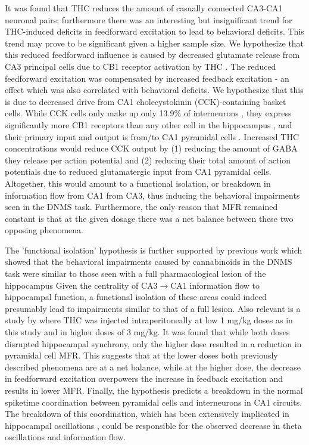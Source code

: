 \documentclass[11pt,a4paper,final]{article}
\begin{document}
It was found that THC reduces the amount of casually connected CA3-CA1 neuronal pairs; furthermore there was an interesting but insignificant trend for THC-induced deficits in feedforward excitation to lead to behavioral deficits.
This trend may prove to be significant given a higher sample size. 
We hypothesize that this reduced feedforward influence is caused by decreased glutamate release from CA3 principal cells due to CB1 receptor activation by THC \citep{shen96}.
The reduced feedforward excitation was compensated by increased feedback excitation - an effect which was also correlated with behavioral deficits.
We hypothesize that this is due to decreased drive from CA1 cholecystokinin (CCK)-containing basket cells.
While CCK cells only make up only 13.9\% of interneurons \citep{bezaire13}, they express significantly more CB1 receptors than any other cell in the hippocampus \citep{katona00}, and their primary input and output is from/to CA1 pyramidal cells \citep{bezaire13}.
Increased THC concentrations would reduce CCK output by (1) reducing the amount of GABA they release per action potential and (2) reducing their total amount of action potentials due to reduced glutamatergic input from CA1 pyramidal cells.
Altogether, this would amount to a functional isolation, or breakdown in information flow from CA1 from CA3, thus inducing the behavioral impairments seen in the DNMS task.
Furthermore, the only reason that MFR remained constant is that at the given dosage there was a net balance between these two opposing phenomena.

The 'functional isolation' hypothesis is further supported by previous work which showed that the behavioral impairments caused by cannabinoids in the DNMS task were similar to those seen with a full pharmacological lesion of the hippocampus \citep{hampson98}
Given the centrality of CA3$\to$CA1 information flow to hippocampal function, a functional isolation of these areas could indeed presumably lead to impairments similar to that of a full lesion.
Also relevant is a study by \citet{goon10} where THC was injected intraperitoneally at low 1 mg/kg doses as in this study and in higher doses of 3 mg/kg.
It was found that while both doses disrupted hippocampal synchrony, only the higher dose resulted in a reduction in pyramidal cell MFR.
This suggests that at the lower doses both previously described phenomena are at a net balance, while at the higher dose, the decrease in feedforward excitation overpowers the increase in feedback excitation and results in lower MFR.
Finally, the hypothesis predicts a breakdown in the normal spiketime coordination between pyramidal cells and interneurons in CA1 circuits.
The breakdown of this coordination, which has been extensively implicated in hippocampal oscillations \citep{traub03,kopell05}, could be responsible for the observed decrease in theta oscillations and information flow.
\end{document}
